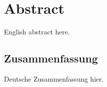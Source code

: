 \thispagestyle{empty}

\begingroup

\chapter*{Abstract}
English abstract here.

\endgroup
\lipsum[1]
\cleardoublepage

\begingroup

\begin{otherlanguage}{ngerman}
\chapter*{Zusammenfassung}

Deutsche Zusammenfassung hier.

\end{otherlanguage}

\endgroup